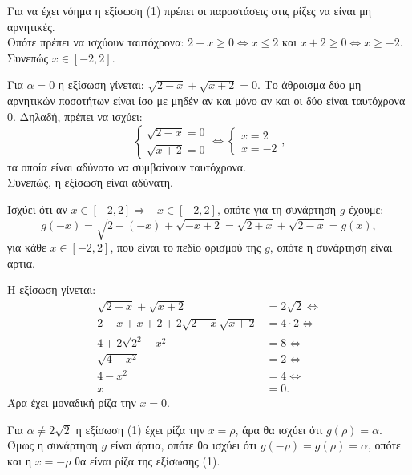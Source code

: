 \begin{alist}
\item Για να έχει νόημα η εξίσωση (1) πρέπει οι παραστάσεις στις ρίζες να είναι μη αρνητικές. \\
Οπότε πρέπει να ισχύουν ταυτόχρονα: $2 - x \ge 0 \Leftrightarrow x \le 2$ και $x + 2 \ge 0 \Leftrightarrow x \ge -2$. \\
Συνεπώς $x \in [-2, 2]$.
\item Για $\alpha = 0$ η εξίσωση γίνεται: $\sqrt{2-x} + \sqrt{x+2} = 0$. Το άθροισμα δύο μη αρνητικών ποσοτήτων είναι ίσο με μηδέν αν και μόνο αν και οι δύο είναι ταυτόχρονα $0$. Δηλαδή, πρέπει να ισχύει:
\[\begin{cases} \sqrt{2-x} = 0 \\ \sqrt{x+2} = 0 \end{cases} \Leftrightarrow \begin{cases} x = 2 \\ x = -2 \end{cases},\]
τα οποία είναι αδύνατο να συμβαίνουν ταυτόχρονα. \\
Συνεπώς, η εξίσωση είναι αδύνατη.
\item Ισχύει ότι αν $x \in [-2, 2] \Rightarrow -x \in [-2, 2]$, οπότε για τη συνάρτηση $g$ έχουμε:
\[g(-x) = \sqrt{2 - (-x)} + \sqrt{-x + 2} = \sqrt{2+x} + \sqrt{2-x} = g(x),\]
για κάθε $x \in [-2, 2]$, που είναι το πεδίο ορισμού της $g$, οπότε η συνάρτηση είναι άρτια.
\item 
\begin{rlist}
\item Η εξίσωση γίνεται:
\begin{align*}
\sqrt{2-x} + \sqrt{x+2} &= 2\sqrt{2} \Leftrightarrow \\ 
2 - x + x + 2 + 2\sqrt{2-x}\sqrt{x+2} &= 4\cdot 2 \Leftrightarrow \\
4 + 2\sqrt{2^2 - x^2} &= 8 \Leftrightarrow \\ 
\sqrt{4-x^2} &= 2 \Leftrightarrow \\ 
4 - x^2 &= 4 \Leftrightarrow \\ 
x &= 0.
\end{align*}
Άρα έχει μοναδική ρίζα την $x = 0$.
\item Για $\alpha \neq 2\sqrt{2}$ η εξίσωση (1) έχει ρίζα την $x = \rho$, άρα θα ισχύει ότι $g(\rho) = \alpha$. Όμως η συνάρτηση $g$ είναι άρτια, οπότε θα ισχύει ότι $g(-\rho) = g(\rho) = \alpha$, οπότε και η $x = -\rho$ θα είναι ρίζα της εξίσωσης (1).
\end{rlist}
\end{alist}

